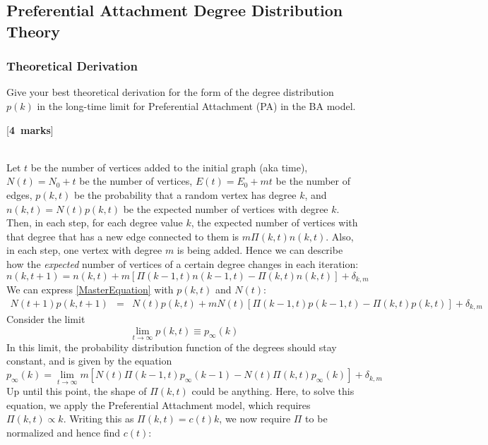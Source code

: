\documentclass[a4paper,12pt]{article}
\newcounter{nmarks}
\newcommand{\qmarks}[1]{\addtocounter{nmarks}{#1} }
\renewcommand{\qmarks}[1]{\addtocounter{nmarks}{#1} \hspace*{\fill} [\textbf{#1~marks}]}
\begin{document}
\subsection{Preferential Attachment Degree Distribution Theory}

\subsubsection{Theoretical Derivation}
Give your best theoretical derivation for the form of the degree distribution $p(k)$ in the long-time limit for Preferential Attachment (PA) in the BA model. \qmarks{4}

\hfill\\
Let $t$ be the number of vertices added to the initial graph (aka time), $N(t)=N_0+t$ be the number of vertices, $E(t)=E_0 + mt$ be the number of edges, $p(k, t)$ be the probability that a random vertex has degree $k$, and $n(k, t)=N(t)p(k,t)$ be the expected number of vertices with degree $k$. Then, in each step, for each degree value $k$, the expected number of vertices with that degree that has a new edge connected to them is $m\Pi(k,t)n(k,t)$. Also, in each step, one vertex with degree $m$ is being added. Hence we can describe how the \textit{expected} number of vertices of a certain degree changes in each iteration:
\begin{equation} \label{MasterEquation}
n(k, t+1) = n(k, t) + m \left[\Pi(k-1,t)n(k-1,t) - \Pi(k,t)n(k,t)\right] + \delta_{k,m}
\end{equation}
We can express \ref{MasterEquation} with $p(k,t)$ and $N(t)$:
\begin{eqnarray*}
N(t+1)p(k, t+1) &=& N(t)p(k, t) + mN(t) \left[\Pi(k-1,t)p(k-1,t) - \Pi(k,t)p(k,t)\right] + \delta_{k,m}
\end{eqnarray*}
Consider the limit
$$\lim_{t\to\infty} p(k,t)\equiv p_\infty (k)$$
In this limit, the probability distribution function of the degrees should stay constant, and is given by the equation
\begin{equation} \label{MasterEquationLimit}
p_\infty(k) = \lim_{t\to\infty} m \left[N(t)\Pi(k-1,t)p_\infty(k-1) - N(t)\Pi(k,t)p_\infty(k)\right] + \delta_{k,m}
\end{equation}
Up until this point, the shape of $\Pi(k,t)$ could be anything. Here, to solve this equation, we apply the Preferential Attachment model, which requires $\Pi(k,t)\propto k$. Writing this as $\Pi(k,t)=c(t)k$, we now require $\Pi$ to be normalized and hence find $c(t)$:
\end{document}
